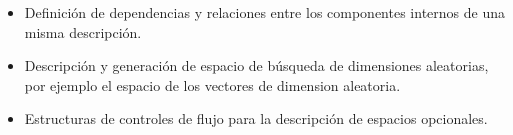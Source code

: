 \begin{itemize}
\begin{itemize}
              \item Definición de dependencias y relaciones entre los componentes internos de una misma descripción.
              \item Descripción y generación de espacio de búsqueda de dimensiones aleatorias, por ejemplo el espacio
                    de los vectores de dimension aleatoria.
              \item Estructuras de controles de flujo para la descripción de espacios opcionales.
          \end{itemize}

\end{itemize}



\newcommand*\rot{\rotatebox{90}}
\newcommand*\OK{\ding{51}}


